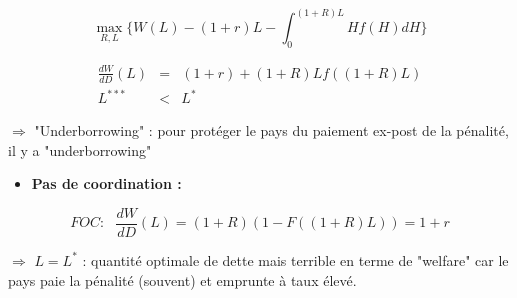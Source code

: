 \documentclass[a4paper]{article}
\begin{document}
\begin{equation*}
\max_{R,L}\{W(L)-(1+r)L-\int_{0}^{(1+R)L}Hf(H)dH\}
\end{equation*}

\begin{eqnarray*}
\frac{dW}{dD}(L) &=&(1+r)+(1+R)Lf((1+R)L) \\
L^{\ast \ast \ast } &<&L^{\ast }
\end{eqnarray*}

$\Longrightarrow $ "Underborrowing" : pour prot\'{e}ger le pays du paiement
ex-post de la p\'{e}nalit\'{e}, il y a "underborrowing"

\begin{itemize}
\item \textbf{Pas de coordination :}
\end{itemize}

\begin{equation*}
FOC:\text{ }\frac{dW}{dD}(L)=(1+R)(1-F((1+R)L))=1+r
\end{equation*}

$\Longrightarrow $ $L=L^{\ast }$ : quantit\'{e} optimale de dette mais
terrible en terme de "welfare" car le pays paie la p\'{e}nalit\'{e}
(souvent) et emprunte \`{a} taux \'{e}lev\'{e}.

\bigskip

\end{document}
